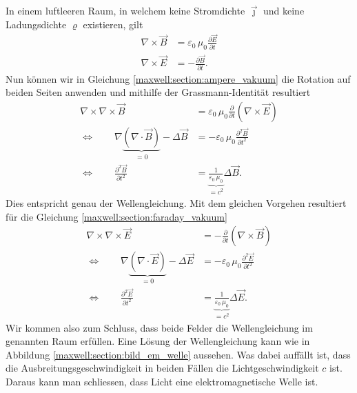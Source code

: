 In einem luftleeren Raum, in welchem keine Stromdichte $\vec{\jmath}$ und keine Ladungsdichte $\varrho$ existieren, gilt
\begin{align}
\nabla \times \vec{B}
&=
\varepsilon_0\,\mu_0 \frac{\partial \vec{E}}{\partial t}
\label{maxwell:section:ampere_vakuum}
\\
\nabla \times \vec{E}
&=
-\frac{\partial \vec{B}}{\partial t}.
\label{maxwell:section:faraday_vakuum}
\end{align}
Nun können wir in Gleichung \eqref{maxwell:section:ampere_vakuum} die Rotation auf beiden Seiten anwenden und mithilfe der Grassmann-Identität resultiert
\begin{align*}
\nabla \times \nabla \times \vec{B}
&=
\varepsilon_0\,\mu_0 \frac{\partial}{\partial t} (\nabla \times \vec{E})\\
\Leftrightarrow \qquad \nabla \underbrace{(\nabla \cdot \vec{B})}_{\displaystyle=0} - \Delta \vec{B}
&=
-\varepsilon_0\,\mu_0 \frac{\partial ^2 \vec{B}}{\partial t^2}\\
\Leftrightarrow \qquad \frac{\partial ^2 \vec{B}}{\partial t^2}
&=
\underbrace{\frac{1}{\varepsilon_0\,\mu_0}}_{\displaystyle=c^2} \Delta \vec{B}.
\end{align*}
Dies entspricht genau der Wellengleichung.
Mit dem gleichen Vorgehen resultiert für die Gleichung \eqref{maxwell:section:faraday_vakuum}
\begin{align*}
\nabla \times \nabla \times \vec{E}
&=
- \frac{\partial}{\partial t} (\nabla \times \vec{B})\\
\Leftrightarrow \qquad \nabla \underbrace{(\nabla \cdot \vec{E})}_{\displaystyle=0} - \Delta \vec{E}
&=
- \varepsilon_0\,\mu_0 \frac{\partial ^2 \vec{E}}{\partial t^2}\\
\Leftrightarrow \qquad \frac{\partial ^2 \vec{E}}{\partial t^2}
&=
\underbrace{\frac{1}{\varepsilon_0\,\mu_0}}_{\displaystyle=c^2} \Delta \vec{E}.
\end{align*}
Wir kommen also zum Schluss, dass beide Felder die Wellengleichung im genannten Raum erfüllen. Eine Lösung der Wellengleichung kann wie in Abbildung \ref{maxwell:section:bild_em_welle} aussehen. Was dabei auffällt ist, dass die Ausbreitungsgeschwindigkeit in beiden Fällen die Lichtgeschwindigkeit $c$ ist. Daraus kann man schliessen, dass Licht eine elektromagnetische Welle ist.



